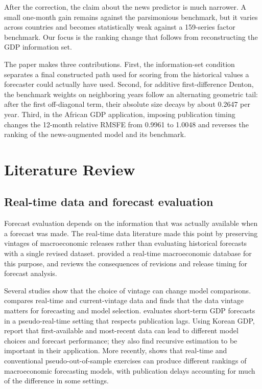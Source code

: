 \documentclass[preprint,12pt,authoryear]{elsarticle}
\begin{document}
After the correction, the claim about the news predictor is much narrower. A small one-month gain remains against the parsimonious benchmark, but it varies across countries and becomes statistically weak against a 159-series factor benchmark. Our focus is the ranking change that follows from reconstructing the GDP information set.

The paper makes three contributions. First, the information-set condition separates a final constructed path used for scoring from the historical values a forecaster could actually have used. Second, for additive first-difference Denton, the benchmark weights on neighboring years follow an alternating geometric tail: after the first off-diagonal term, their absolute size decays by about 0.2647 per year. Third, in the African GDP application, imposing publication timing changes the 12-month relative RMSFE from 0.9961 to 1.0048 and reverses the ranking of the news-augmented model and its benchmark.
\section{Literature Review}

\subsection{Real-time data and forecast evaluation}

Forecast evaluation depends on the information that was actually available when a forecast was made. The real-time data literature made this point by preserving vintages of macroeconomic releases rather than evaluating historical forecasts with a single revised dataset. \citet{croushorestark2001} provided a real-time macroeconomic database for this purpose, and \citet{croushore2006} reviews the consequences of revisions and release timing for forecast analysis.

Several studies show that the choice of vintage can change model comparisons. \citet{feng2009} compares real-time and current-vintage data and finds that the data vintage matters for forecasting and model selection. \citet{ruenstler2009} evaluates short-term GDP forecasts in a pseudo-real-time setting that respects publication lags. Using Korean GDP, \citet{kimswanson2018} report that first-available and most-recent data can lead to different model choices and forecast performance; they also find recursive estimation to be important in their application. More recently, \citet{pfarrhofer2024} shows that real-time and conventional pseudo-out-of-sample exercises can produce different rankings of macroeconomic forecasting models, with publication delays accounting for much of the difference in some settings.
\end{document}
